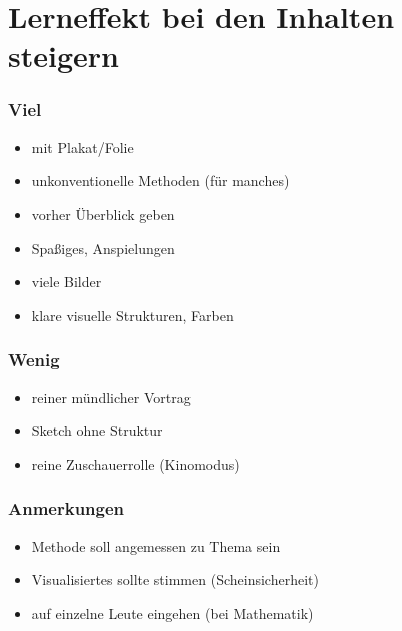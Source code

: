 \section{Lerneffekt bei den Inhalten steigern}
\label{lerneffekt}

\subsubsection{Viel}
\begin{itemize}
    \item mit Plakat/Folie
    \item unkonventionelle Methoden (für manches)
    \item vorher Überblick geben
    \item Spaßiges, Anspielungen
    \item viele Bilder
    \item klare visuelle Strukturen, Farben
\end{itemize}

\subsubsection{Wenig}
\begin{itemize}
    \item reiner mündlicher Vortrag
    \item Sketch ohne Struktur
    \item reine \glqq Zuschauerrolle\grqq{} (Kinomodus)
\end{itemize}

\subsubsection{Anmerkungen}
\begin{itemize}
    \item Methode soll angemessen zu Thema sein
    \item Visualisiertes sollte stimmen (\glqq Scheinsicherheit\grqq)
    \item auf einzelne Leute eingehen (bei Mathematik)
\end{itemize}
